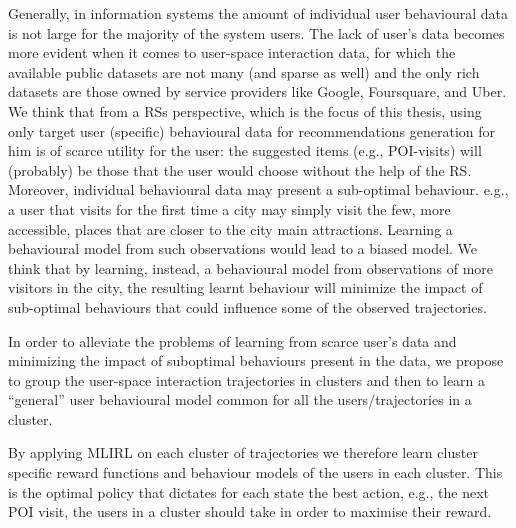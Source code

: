 Generally, in information systems 
the amount of individual user behavioural data is not large for the majority of the system users. The lack of user's data becomes more evident when it comes to user-space interaction data, for which the available public datasets are not many (and sparse as well) and the only rich datasets are those owned by service providers like Google, Foursquare, and Uber.
We think that from a RSs perspective, which is the focus of this thesis, using only target user (specific) behavioural data
for recommendations generation for him is of scarce utility for the user: 
the suggested items (e.g., POI-visits) will (probably) be those that the user would choose without the help of the RS. 
Moreover, individual behavioural data may present a sub-optimal behaviour. e.g., a user that visits for the first time a city may simply visit the few, more accessible, places that are closer to the city main attractions. Learning a behavioural model from such observations would lead to a biased model. We think that by learning, instead, a behavioural model from observations of more visitors 
in the city, the resulting learnt behaviour will minimize the impact of sub-optimal behaviours that could influence some of the observed trajectories.

In order to alleviate the problems of learning from scarce user's data and minimizing the impact of suboptimal behaviours present in the data, we propose to group the user-space interaction trajectories in clusters and then to learn a ``general'' user behavioural model common for all the users/trajectories in a cluster.

By applying MLIRL on each cluster of trajectories we therefore learn cluster specific reward functions and behaviour models of the users in each cluster. This is the optimal policy that dictates for each state the best action, e.g., the next POI visit, the users in a cluster should take in order to maximise their reward.


